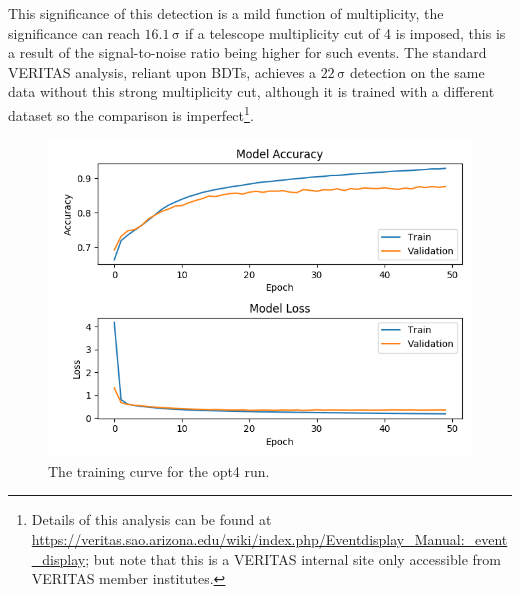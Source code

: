 \begin{table}[h]
    \centering
    \caption{Anasum output for the opt4 run, without applying a strenuous multiplicity cut.}
    \label{table:opt4}
\end{table}

This significance of this detection is a mild function of multiplicity, the significance can reach $\mathrm{16.1\,\sigma}$ if a telescope multiplicity cut of 4 is imposed, this is a result of the signal-to-noise ratio being higher for such events. The standard VERITAS analysis, reliant upon BDTs, achieves a $\mathrm{22\,\sigma}$ detection on the same data without this strong multiplicity cut, although it is trained with a different dataset so the comparison is imperfect\footnote{Details of this analysis can be found at \url{https://veritas.sao.arizona.edu/wiki/index.php/Eventdisplay_Manual:_event_display}; but note that this is a VERITAS internal site only accessible from VERITAS member institutes.}.

\begin{figure}[h] 
        \centering \includegraphics[width=\columnwidth]{figures/crabrun2opt4trainlog.png}

        \caption{
                \label{fig:opt4_trainlog} The training curve for the opt4 run.
        }
\end{figure}

